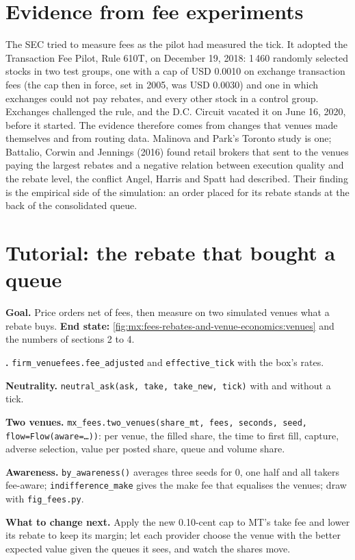\section{Evidence from fee experiments}

The SEC tried to measure fees as the  pilot had measured the tick. It adopted the Transaction Fee Pilot, Rule 610T, on December 19, 2018: 1\,460
randomly selected stocks in two test groups, one with a cap of USD 0.0010 on exchange transaction fees (the cap then in force, set in 2005, was
USD 0.0030) and one in which exchanges could not pay rebates, and every other stock in a control group. Exchanges challenged the rule, and the D.C. Circuit
vacated it on June 16, 2020, before it started. The evidence therefore comes from changes that venues made themselves and from routing data. Malinova
and Park's Toronto study is one; Battalio, Corwin and Jennings (2016) found retail brokers that sent  to the venues paying the largest rebates
and a negative relation between  execution quality and the rebate level, the conflict Angel, Harris and Spatt had described. Their finding is
the empirical side of the simulation: an order placed for its rebate stands at the back of the consolidated queue.

\section{Tutorial: the rebate that bought a queue}\label{tut:mx:fees-rebates-and-venue-economics:tut}

\begin{tutorial}
\textbf{Goal.} Price orders net of fees, then measure on two simulated venues what a rebate buys.
\textbf{End state:} \cref{fig:mx:fees-rebates-and-venue-economics:venues} and the numbers of sections 2 to 4.
\begin{tutsteps}
\item \textbf{.} \texttt{firm\_venuefees.fee\_adjusted} and \texttt{effective\_tick} with the box's rates.
\item \textbf{Neutrality.} \texttt{neutral\_ask(ask, take, take\_new, tick)} with and without a tick.
\item \textbf{Two venues.} \texttt{mx\_fees.two\_venues(share\_mt, fees, seconds, seed, flow=Flow(aware=\dots))}: per venue, the filled share, the time to
first fill, capture, adverse selection, value per posted share, queue and volume share.
\item \textbf{Awareness.} \texttt{by\_awareness()} averages three seeds for 0, one half and all takers fee-aware; \texttt{indifference\_make} gives the
make fee that equalises the venues; draw with \texttt{fig\_fees.py}.
\end{tutsteps}
\textbf{What to change next.} Apply the new 0.10-cent cap to MT's take fee and lower its rebate to keep its margin; let each provider choose the venue
with the better expected value given the queues it sees, and watch the shares move.
\end{tutorial}

